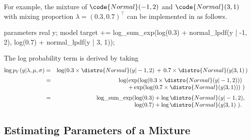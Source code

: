 For example, the mixture of $\code{Normal}(-1,2)$ and
$\code{Normal}(3,1)$ with mixing proportion $\lambda =
(0.3,0.7)^{\top}$ can be implemented in \Stan as follows.
%
\begin{stancode}
parameters {
  real y;
}
model {
  target += log_sum_exp(log(0.3) + normal_lpdf(y | -1, 2),
                        log(0.7) + normal_lpdf(y | 3, 1));
}
\end{stancode}
%
The log probability term is derived by taking
%
\begin{eqnarray*}
\log p_Y(y | \lambda,\mu,\sigma) & = & \log\!\left( 0.3 \times \distro{Normal}(y|-1,2) \, + \,
  0.7 \times
  \distro{Normal}(y|3,1) \, \right)
\\[2pt]
& = & \log(\hspace*{-5pt} \begin{array}[t]{l}
                 \exp(\log(0.3 \times \distro{Normal}(y|-1,2))) \\
                 + \exp(\log(0.7 \times \distro{Normal}(y|3,1))) \ )
              \end{array}
\\[2pt]
& = & \mbox{log\_sum\_exp}(\hspace*{-5pt}\begin{array}[t]{l}
                         \log(0.3) + \log \distro{Normal}(y|-1,2),
                         \\                  
                         \log(0.7) + \log \distro{Normal}(y|3,1) \ ).
                       \end{array}
\end{eqnarray*}
%

\subsection{Estimating Parameters of a Mixture}


